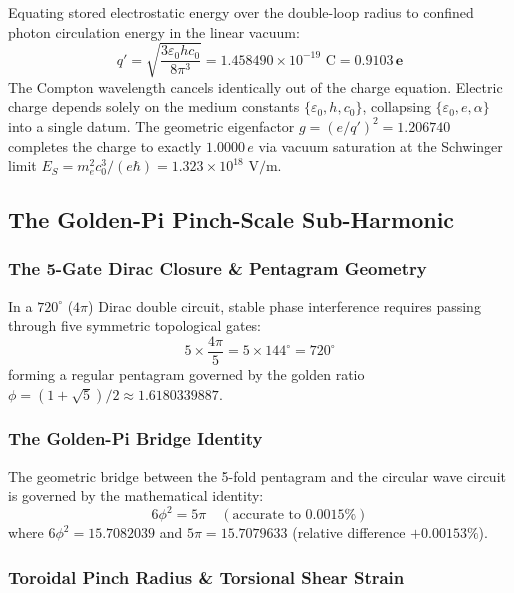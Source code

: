 \documentclass[11pt,a4paper]{article}
\begin{document}
Equating stored electrostatic energy over the double-loop radius to confined photon circulation energy in the linear vacuum:
\begin{equation}
\boxed{q' = \sqrt{\frac{3\varepsilon_0 h c_0}{8\pi^3}} = 1.458490 \times 10^{-19}\text{ C} = \mathbf{0.9103\,e}}
\end{equation}
The Compton wavelength cancels identically out of the charge equation. Electric charge depends solely on the medium constants $\{\varepsilon_0, h, c_0\}$, collapsing $\{\varepsilon_0, e, \alpha\}$ into a single datum. The geometric eigenfactor $g = (e/q')^2 = 1.206740$ completes the charge to exactly $1.0000\,e$ via vacuum saturation at the Schwinger limit $E_S = m_e^2 c_0^3 / (e\hbar) = 1.323 \times 10^{18}\text{ V/m}$.

\subsection{The Golden-Pi Pinch-Scale Sub-Harmonic}
\label{subsec:golden_pi}

\subsubsection{The 5-Gate Dirac Closure \& Pentagram Geometry}
\label{subsubsec:dirac_closure}

In a $720^\circ$ ($4\pi$) Dirac double circuit, stable phase interference requires passing through five symmetric topological gates:
\begin{equation}
5 \times \frac{4\pi}{5} = 5 \times 144^\circ = 720^\circ
\end{equation}
forming a regular pentagram governed by the golden ratio $\phi = (1 + \sqrt{5})/2 \approx 1.6180339887$.

\subsubsection{The Golden-Pi Bridge Identity}
\label{subsubsec:golden_pi_bridge}

The geometric bridge between the 5-fold pentagram and the circular wave circuit is governed by the mathematical identity:
\begin{equation}
\boxed{6\phi^2 = 5\pi \quad (\text{accurate to } \mathbf{0.0015\%})}
\end{equation}
where $6\phi^2 = 15.7082039$ and $5\pi = 15.7079633$ (relative difference $+0.00153\%$).

\subsubsection{Toroidal Pinch Radius \& Torsional Shear Strain}
\label{subsubsec:pinch_radius}
\end{document}

